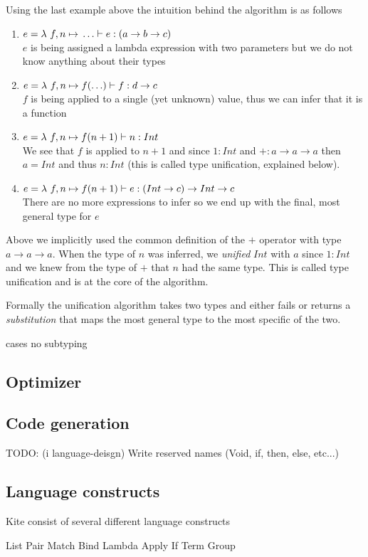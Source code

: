 Using the last example above the intuition behind the algorithm is as follows

\begin{enumerate}
\item $e = \lambda{} \ f, n \mapsto{} \ldots \vdash e: (a \to b \to c)$ \\
  $e$ is being assigned a lambda expression with two parameters but we do not know anything about their types
\item $e = \lambda{} \ f, n \mapsto{} f(\ldots) \vdash f: d \to c$ \\
  $f$ is being applied to a single (yet unknown) value, thus we can infer that it is a function
\item $e = \lambda{} \ f, n \mapsto{} f(n + 1) \vdash n : Int$ \\
  We see that $f$ is applied to $n+1$ and since $1: Int$ and $+:a \to a \to a$ then $a = Int$ and thus $n:Int$ (this is called type unification, explained below).
\item $e = \lambda{} \ f, n \mapsto{} f(n + 1) \vdash e : (Int \to c) \to Int \to c$ \\
  There are no more expressions to infer so we end up with the final, most general type for $e$
\end{enumerate}


Above we implicitly used the common definition of the $+$ operator with type $a \to a \to a$. When the type of $n$ was inferred, we \emph{unified} $Int$ with $a$ since $1 : Int$ and we knew from the type of $+$ that $n$ had the same type. This is called type unification and is at the core of the algorithm.

Formally the unification algorithm takes two types and either fails or returns a \emph{substitution} that maps the most general type to the most specific of the two.


cases
no subtyping



\subsection{Optimizer}
\subsection{Code generation}

TODO: (i language-deisgn) Write reserved names (Void, if, then, else, etc...)

\subsection{Language constructs}

Kite consist of several different language constructs

List
Pair
Match
Bind
Lambda
Apply
If
Term
Group



